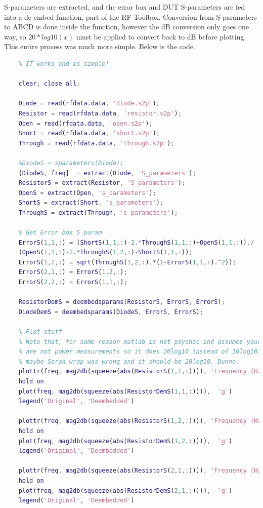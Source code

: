 \documentclass{article} %
\begin{document}
	S-parameters are extracted, and the error box and DUT S-parameters are fed into a de-embed function, part of the RF Toolbox.  Conversion from S-parameters to ABCD is done inside the function, however the dB conversion only goes one way, so $20*log10(x)$ must be applied to convert back to dB before plotting.  This entire process was much more simple.  Below is the code.
	
	\begin{lstlisting}[language=Matlab, caption=De-embedding with RF Toolbox]
	%ECE802Deembedder3
	% IT works and is simple!
	
	clear; close all;
	
	Diode = read(rfdata.data, 'diode.s2p');
	Resistor = read(rfdata.data, 'resistor.s2p');
	Open = read(rfdata.data, 'open.s2p');
	Short = read(rfdata.data, 'short.s2p');
	Through = read(rfdata.data, 'through.s2p');
	
	%DiodeS = sparameters(Diode);
	[DiodeS, freq]  = extract(Diode, 'S_parameters');
	ResistorS = extract(Resistor, 'S_parameters');
	OpenS = extract(Open, 's_parameters');
	ShortS = extract(Short, 's_parameters');
	ThroughS = extract(Through, 's_parameters');

	% Get Error box S param
	ErrorS(1,1,:) = (ShortS(1,1,:)-2.*ThroughS(1,1,:)+OpenS(1,1,:))./ ...
	(OpenS(1,1,:)-2.*ThroughS(1,2,:)-ShortS(1,1,:));
	ErrorS(1,2,:) = sqrt(ThroughS(1,2,:).*(1-ErrorS(1,1,:).^2));
	ErrorS(2,1,:) = ErrorS(1,2,:);
	ErrorS(2,2,:) = ErrorS(1,1,:);
	
	ResistorDemS = deembedsparams(ResistorS, ErrorS, ErrorS);
	DiodeDemS = deembedsparams(DiodeS, ErrorS, ErrorS);
	
	% Plot stuff
	% Note that, for some reason matlab is not psychic and assumes your data
	% are not power measurements so it does 20log10 instead of 10log10.  Or
	% maybe Saran wrap was wrong and it should be 20log10. Dunno.
	plottr(freq, mag2db(squeeze(abs(ResistorS(1,1,:)))), 'Frequency (Hz)', '|S11|', 'Resistor S11')
	hold on
	plot(freq, mag2db(squeeze(abs(ResistorDemS(1,1,:)))),  'g')
	legend('Original', 'Deembedded')
	
	plottr(freq, mag2db(squeeze(abs(ResistorS(1,2,:)))), 'Frequency (Hz)', '|S12|', 'Resistor S12')
	hold on
	plot(freq, mag2db(squeeze(abs(ResistorDemS(1,2,:)))),  'g')
	legend('Original', 'Deembedded')
	
	plottr(freq, mag2db(squeeze(abs(ResistorS(2,1,:)))), 'Frequency (Hz)', '|S21|', 'Resistor S21')
	hold on
	plot(freq, mag2db(squeeze(abs(ResistorDemS(2,1,:)))),  'g')
	legend('Original', 'Deembedded')
	

\end{lstlisting}
\end{document}
